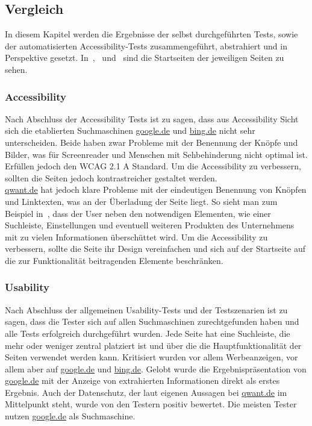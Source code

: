 \subsection{Vergleich}\label{subsec:vergleich}
In diesem Kapitel werden die Ergebnisse der selbst durchgeführten Tests,
sowie der automatisierten Accessibility-Tests zusammengeführt, abstrahiert und in Perspektive gesetzt.
In~,~ und~ sind die Startseiten der jeweiligen Seiten zu sehen.\\

\subsubsection*{Accessibility}\label{subsubsec:accessibility}
Nach Abschluss der Accessibility Tests ist zu sagen,
dass aus Accessibility Sicht sich die etablierten Suchmaschinen \url{google.de} und \url{bing.de} nicht sehr unterscheiden.
Beide haben zwar Probleme mit der Benennung der Knöpfe und Bilder, was für Screenreader und Menschen mit Sehbehinderung nicht optimal ist.
Erfüllen jedoch den WCAG 2.1 A Standard.
Um die Accessibility zu verbessern, sollten die Seiten jedoch kontrastreicher gestaltet werden.\\

\url{qwant.de} hat jedoch klare Probleme mit der eindeutigen Benennung von Knöpfen und Linktexten, was an der Überladung der Seite liegt.
So sieht man zum Beispiel in~, dass der User neben den notwendigen Elementen,
wie einer Suchleiste, Einstellungen und eventuell weiteren Produkten des Unternehmens mit zu vielen Informationen überschüttet wird.
Um die Accessibility zu verbessern, sollte die Seite ihr Design vereinfachen und sich auf der Startseite auf die zur Funktionalität beitragenden Elemente beschränken.

\subsubsection*{Usability}\label{subsubsec:usability}
Nach Abschluss der allgemeinen Usability-Tests und der Testszenarien ist zu sagen, dass
die Tester sich auf allen Suchmaschinen zurechtgefunden haben und alle Tests erfolgreich durchgeführt wurden.
Jede Seite hat eine Suchleiste, die mehr oder weniger zentral platziert ist und über die die Hauptfunktionalität der Seiten verwendet werden kann.
Kritisiert wurden vor allem Werbeanzeigen, vor allem aber auf \url{google.de} und \url{bing.de}.
Gelobt wurde die Ergebnispräsentation von \url{google.de} mit der Anzeige von extrahierten Informationen direkt als erstes Ergebnis.
Auch der Datenschutz, der laut eigenen Aussagen bei \url{qwant.de} im Mittelpunkt steht, wurde von den Testern positiv bewertet.
Die meisten Tester nutzen \url{google.de} als Suchmaschine.

